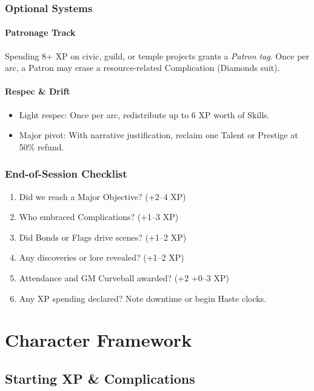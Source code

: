 \documentclass[12pt]{book}
\begin{document}
\section{Optional Systems}

\subsection*{Patronage Track}
Spending 8+ XP on civic, guild, or temple projects grants a \emph{Patron tag}.  
Once per arc, a Patron may erase a resource-related Complication (Diamonds suit).

\subsection*{Respec \& Drift}
\begin{itemize}
  \item Light respec: Once per arc, redistribute up to 6 XP worth of Skills.  
  \item Major pivot: With narrative justification, reclaim one Talent or Prestige at 50\% refund.  
\end{itemize}

\section{End-of-Session Checklist}

\begin{enumerate}
  \item Did we reach a Major Objective? (+2--4 XP)  
  \item Who embraced Complications? (+1--3 XP)  
  \item Did Bonds or Flags drive scenes? (+1--2 XP)  
  \item Any discoveries or lore revealed? (+1--2 XP)  
  \item Attendance and GM Curveball awarded? (+2 +0--3 XP)  
  \item Any XP spending declared? Note downtime or begin Haste clocks.  
\end{enumerate}


\part{Character Framework}

\chapter{Starting XP \& Complications}
\end{document}
